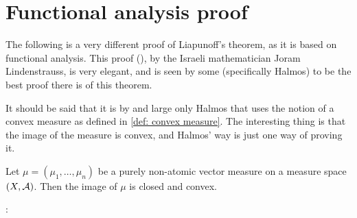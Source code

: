 \section{Functional analysis proof}

The following is a very different proof of Liapunoff's theorem, as it is based on functional analysis. This proof (\cite{Lindenstrauss66}), by the Israeli mathematician Joram Lindenstrauss, is very elegant, and is seen by some (specifically Halmos) to be the best proof there is of this theorem.

It should be said that it is by and large only Halmos that uses the notion of a convex measure as defined in \ref{def: convex measure}. The interesting thing is that the image of the measure is convex, and Halmos' way is just one way of proving it.

\begin{theorem}\label{thm: Lindenstrauss}
Let $\mu=(\mu_{1}, \dots, \mu_{n})$ be a purely non-atomic vector measure on a measure space $(X, \mathcal{A})$. Then the image of $\mu$ is closed and convex.
\end{theorem}:
